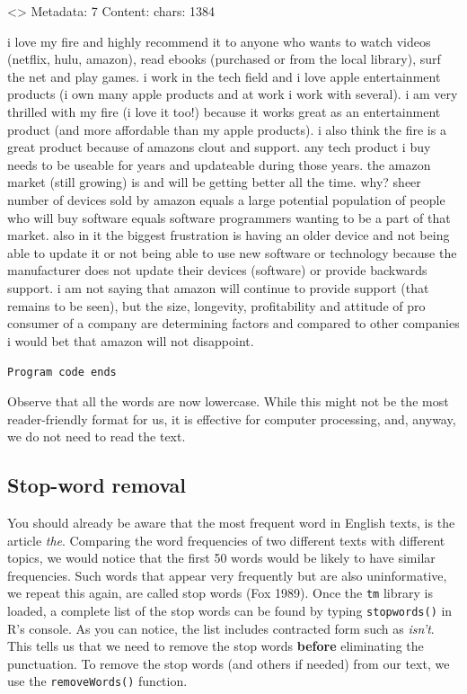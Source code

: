\textless{}\textgreater{} Metadata: 7 Content: chars: 1384

i love my fire and highly recommend it to anyone who wants to watch
videos (netflix, hulu, amazon), read ebooks (purchased or from the local
library), surf the net and play games. i work in the tech field and i
love apple entertainment products (i own many apple products and at work
i work with several). i am very thrilled with my fire (i love it too!)
because it works great as an entertainment product (and more affordable
than my apple products). i also think the fire is a great product
because of amazons clout and support. any tech product i buy needs to be
useable for years and updateable during those years. the amazon market
(still growing) is and will be getting better all the time. why? sheer
number of devices sold by amazon equals a large potential population of
people who will buy software equals software programmers wanting to be a
part of that market. also in it the biggest frustration is having an
older device and not being able to update it or not being able to use
new software or technology because the manufacturer does not update
their devices (software) or provide backwards support. i am not saying
that amazon will continue to provide support (that remains to be seen),
but the size, longevity, profitability and attitude of pro consumer of a
company are determining factors and compared to other companies i would
bet that amazon will not disappoint.

\texttt{Program\ code\ ends}

Observe that all the words are now lowercase. While
this might not be the most reader-friendly format for us, it is
effective for computer processing, and, anyway, we do not need to read
the text.

\subsection{Stop-word removal}\label{stop-words-removal}

You should already be aware that the most frequent word in English
texts, is the article \emph{the}. Comparing the word frequencies of two different texts with
different topics, we would notice that the first
50 words would be likely to have similar frequencies. Such words that appear
very frequently but are also uninformative, we repeat this again,
are called stop words (Fox 1989). Once the \texttt{tm} library is loaded,
a complete list of the stop words can be found by typing
\texttt{stopwords()} in R's console. As you can notice, the list
includes contracted form such as \emph{isn't}. This tells us that we
need to remove the stop words \textbf{before} eliminating the punctuation. To
remove the stop words (and others if needed) from our text, we use the
\texttt{removeWords()} function.

